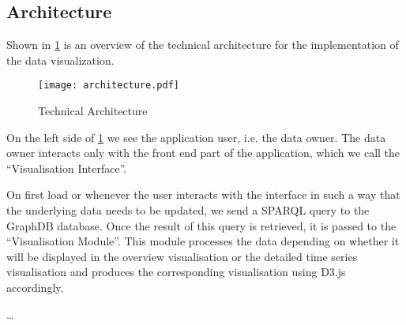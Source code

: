 \documentclass[../paper.tex]{subfiles}
\begin{document}
  \subsection{Architecture}

  Shown in \cref{fig:architecture} is an overview of the technical architecture
  for the implementation of the data visualization.

  \begin{figure}
    \centering
    \texttt{[image: architecture.pdf]}
    \caption{Technical Architecture}
    \label{fig:architecture}
  \end{figure}

  On the left side of \cref{fig:architecture} we see the application user, i.e.
  the data owner. The data owner interacts only with the front end part of the
  application, which we call the “Visualisation Interface”.

  On first load or whenever the user interacts with the interface in such a way
  that the underlying data needs to be updated, we send a SPARQL query to the
  GraphDB database. Once the result of this query is retrieved, it is passed to
  the “Visualisation Module”. This module processes the data depending on
  whether it will be displayed in the overview visualisation or the detailed
  time series visualisation and produces the corresponding visualisation
  using D3.js accordingly.


  …
\end{document}
